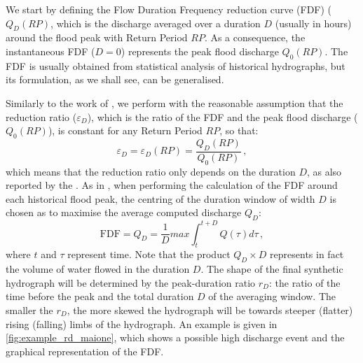 We start by defining the Flow Duration Frequency reduction curve (FDF) ($Q_D\left( RP \right)$, which is the discharge averaged over a duration $D$ (usually in hours) around the flood peak with Return Period $RP$.
As a consequence, the instantaneous FDF ($D=0$) represents the peak flood discharge $Q_0\left( RP \right)$.
The FDF is usually obtained from statistical analysis of historical hydrographs, but its formulation, as we shall see, can be generalised.

Similarly to the work of \citet{Maione2003}, we perform with the reasonable assumption that the reduction ratio ($\varepsilon_D$), which is the ratio of the FDF and the peak flood discharge ($Q_0\left( RP \right)$), is constant for any Return Period $RP$, so that:
\begin{equation}
  \varepsilon_D = \varepsilon_D\left( RP \right) = \frac{Q_D\left( RP \right)}{Q_0\left( RP \right)}\,,
  \end{equation} 
which means that the reduction ratio only depends on the duration $D$, as also reported by the \citet{NERC1975}.
As in \citet{Maione2003}, when performing the calculation of the FDF around each historical flood peak, the centring of the duration window of width $D$ is chosen as to maximise the average computed discharge $Q_D$:
\begin{equation}
  \text{FDF} = Q_D = \frac{1}{D} max \int_{t}^{t+D} Q \left(\tau \right) d\tau \,,
\end{equation}
where $t$ and $\tau$ represent time. Note that the product $Q_D \times D$ represents in fact the volume of water flowed in the duration $D$. The shape of the final synthetic hydrograph will be determined by the peak-duration ratio $r_D$: the ratio of the time before the peak and the total duration $D$ of the averaging window.
The smaller the $r_D$, the more skewed the hydrograph will be towards steeper (flatter) rising (falling) limbs of the hydrograph.
An example is given in \cref{fig:example_rd_maione}, which shows a possible high discharge event and the graphical representation of the FDF.


